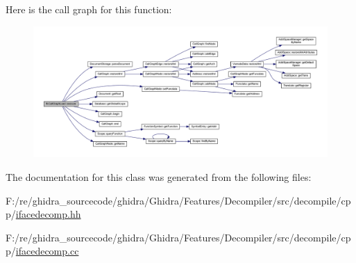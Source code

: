 Here is the call graph for this function\+:
\nopagebreak
\begin{figure}[H]
\begin{center}
\leavevmode
\includegraphics[width=350pt]{class_ifc_call_graph_load_acbec76d28fb6e2027a3101c33fde7435_cgraph}
\end{center}
\end{figure}


The documentation for this class was generated from the following files\+:\begin{DoxyCompactItemize}
\item 
F\+:/re/ghidra\+\_\+sourcecode/ghidra/\+Ghidra/\+Features/\+Decompiler/src/decompile/cpp/\mbox{\hyperlink{ifacedecomp_8hh}{ifacedecomp.\+hh}}\item 
F\+:/re/ghidra\+\_\+sourcecode/ghidra/\+Ghidra/\+Features/\+Decompiler/src/decompile/cpp/\mbox{\hyperlink{ifacedecomp_8cc}{ifacedecomp.\+cc}}\end{DoxyCompactItemize}
